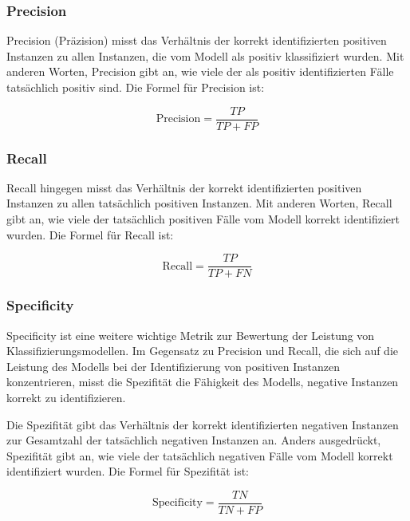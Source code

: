 \subsubsection{Precision}
Precision (Präzision) misst das Verhältnis der korrekt identifizierten positiven Instanzen zu allen Instanzen, die vom Modell als positiv klassifiziert wurden. Mit anderen Worten, Precision gibt an, wie viele der als positiv identifizierten Fälle tatsächlich positiv sind. Die Formel für Precision ist:

\begin{equation}
    \text{Precision} = \frac{TP}{TP + FP}
    \label{eq:PrecisionFormula}
\end{equation}


\subsubsection{Recall}

Recall hingegen misst das Verhältnis der korrekt identifizierten positiven Instanzen zu allen tatsächlich positiven Instanzen. Mit anderen Worten, Recall gibt an, wie viele der tatsächlich positiven Fälle vom Modell korrekt identifiziert wurden. Die Formel für Recall ist:

\begin{equation}
    \text{Recall} = \frac{TP}{TP + FN}
    \label{eq:RecallFormula}
\end{equation}

\subsubsection{Specificity}
Specificity ist eine weitere wichtige Metrik zur Bewertung der Leistung von Klassifizierungsmodellen. Im Gegensatz zu Precision und Recall, die sich auf die Leistung des Modells bei der Identifizierung von positiven Instanzen konzentrieren, misst die Spezifität die Fähigkeit des Modells, negative Instanzen korrekt zu identifizieren.

Die Spezifität gibt das Verhältnis der korrekt identifizierten negativen Instanzen zur Gesamtzahl der tatsächlich negativen Instanzen an. Anders ausgedrückt, Spezifität gibt an, wie viele der tatsächlich negativen Fälle vom Modell korrekt identifiziert wurden. Die Formel für Spezifität ist:

\begin{equation}
    \text{Specificity} = \frac{TN}{TN + FP}
    \label{eq:SpecificityFormula}
\end{equation}

